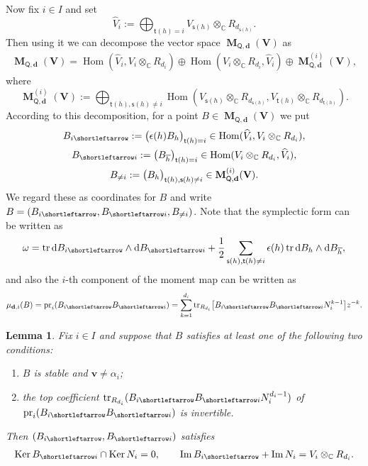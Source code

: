 \documentclass[pdftex]{sigma}
\newcommand{\slar}{\shortleftarrow}
\newenvironment{enm}%
{\begin{enumerate}
\setlength{\itemsep}{0em}
}%
{\end{enumerate}}
\numberwithin{equation}{section}
\newtheorem{Lemma}[Theorem]{Lemma}
\theoremstyle{definition}
\newcommand{\C}{\mathbb{C}} %
\newcommand{\Hom}{\operatorname{Hom}}
\newcommand{\Ker}{\operatorname{Ker}}
\newcommand{\range}{\operatorname{Im}}
\newcommand{\tr}{\operatorname{tr}}
\newcommand{\prj}{\operatorname{pr}}
\newcommand{\bM}{\operatorname{\mathbf{M}}}
\newcommand{\bV}{\mathbf{V}}
\newcommand{\bv}{\mathbf{v}}
\newcommand{\ov}{\overline}
\newcommand{\ved}{\mathbf{d}}
\newcommand{\vin}{\mathsf{t}} %
\newcommand{\vout}{\mathsf{s}} %
\newcommand{\QQ}{\mathsf{Q}} %
\newcommand{\rd}{\mathop{\mathrm{d}\!}\mathstrut}
\begin{document}
Now f\/ix $i \in I$ and set
\[
\widehat{V}_i := \bigoplus_{\vin(h)=i}
V_{\vout(h)} \otimes_\C R_{d_{\vout(h)}}.
\]
Then using it we can decompose the vector space $\bM_{\QQ,\ved}(\bV)$ as
\begin{gather}\label{eq:decomposition}
\bM_{\QQ,\ved}(\bV) =\Hom(\widehat{V}_i,V_i \otimes_\C R_{d_i})
\oplus \Hom(V_i \otimes_\C R_{d_i}, \widehat{V}_i)
\oplus \bM^{(i)}_{\QQ,\ved}(\bV),
\end{gather}
where
\[
\bM^{(i)}_{\QQ,\ved}(\bV) := \bigoplus_{\vin(h), \vout(h) \neq i}
\Hom(V_{\vout(h)} \otimes_\C R_{d_{\vout(h)}},
V_{\vin(h)} \otimes_\C R_{d_{\vin(h)}}).
\]
According to this decomposition,
for a point $B \in \bM_{\QQ,\ved}(\bV)$ we put
\begin{gather*}
B_{i \slar}  := \bigl( \epsilon(h) B_h \bigr)_{\vin(h)=i}
\in \Hom(\widehat{V}_i,V_i \otimes_\C R_{d_i}), \\
B_{\slar i}  := \bigl( B_{\ov{h}} \bigr)_{\vin(h)=i}
\in \Hom(V_i \otimes_\C R_{d_i},\widehat{V}_i), \\
B_{\neq i}  := \bigl( B_h \bigr)_{\vin(h), \vout(h) \neq i}
\in \bM^{(i)}_{\QQ,\ved}(\bV).
\end{gather*}
We regard these as coordinates for $B$ and
write $B=(B_{i \slar},B_{\slar i},B_{\neq i})$.
Note that the symplectic form can be written as
\begin{gather}\label{eq:decomposeform}
\omega = \tr \rd B_{i \slar} \wedge \rd B_{\slar i}
+ \frac12 \sum_{\vout(h),\vin(h) \neq i}
\epsilon(h) \tr \rd B_h \wedge \rd B_{\ov{h}},
\end{gather}
and also the $i$-th component of the moment map can be written as
\[
\mu_{\ved,i}(B) = \prj_i (B_{i \slar} B_{\slar i})
= \sum_{k=1}^{d_i}
\tr_{R_{d_i}} \bigl[ B_{i \slar}  B_{\slar i} N_i^{k-1} \bigr]  z^{-k}.
\]

\begin{Lemma}\label{lem:stability}
Fix $i \in I$ and
suppose that $B$ satisfies at least one of the following two conditions:
\begin{enm}
\item $B$ is stable and $\bv \neq \alpha_i$;
\item the top coefficient
$\tr_{R_{d_i}}(B_{i \slar}  B_{\slar i} N_i^{d_i-1})$
of $\prj_i(B_{i \slar}B_{\slar i})$ is invertible.
\end{enm}
Then $(B_{i \slar},B_{\slar i})$ satisfies
\begin{gather}\label{eq:stability}
\Ker B_{\slar i} \cap \Ker N_i =0, \qquad
\range B_{i \slar} + \range N_i = V_i \otimes_\C R_{d_i}.
\end{gather}
\end{Lemma}
\end{document}
